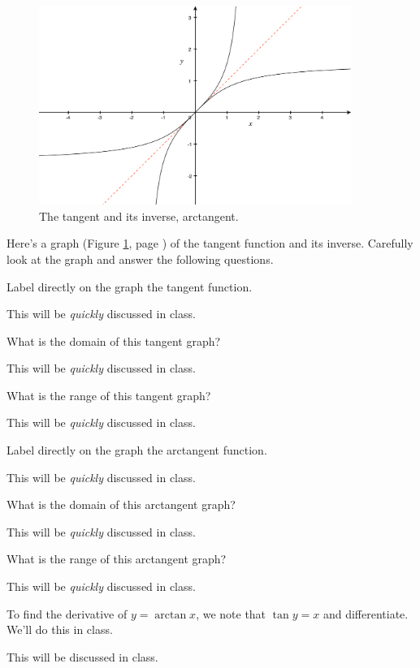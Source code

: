 \documentclass[12pt,addpoints, answers, fleqn]{exam}
\begin{document}
\begin{figure}[htbp] %
   \centering
   \includegraphics[width=4in]{./graphics/graph1604.pdf} 
   \caption{The tangent and its inverse, arctangent.}
   \label{fig:graph1604}
\end{figure}
Here's a graph  (Figure \ref{fig:graph1604}, page \pageref{fig:graph1604}) of the tangent function and its inverse. Carefully look at the graph and answer the following questions.
\begin{questions}
\question Label directly on the graph the tangent function.

\begin{solution}
This will be \emph{quickly} discussed in class.
\end{solution}

\question What is the domain of this tangent graph?

\begin{solution}
This will be \emph{quickly} discussed in class.
\end{solution}

\question What is the range of this tangent graph?
\begin{solution}
This will be \emph{quickly} discussed in class.
\end{solution}

\question Label directly on the graph the arctangent function.

\begin{solution}
This will be \emph{quickly} discussed in class.
\end{solution}

\question What is the domain of this arctangent graph?

\begin{solution}
This will be \emph{quickly} discussed in class.
\end{solution}

\question What is the range of this arctangent graph?

\begin{solution}
This will be \emph{quickly} discussed in class.
\end{solution}

\question To find the derivative of $y = \arctan x$, we note that $\tan y = x$ and differentiate. We'll do this in class.
\begin{solution}
This will be discussed in class.
\end{solution}
\end{questions}
\end{document}

